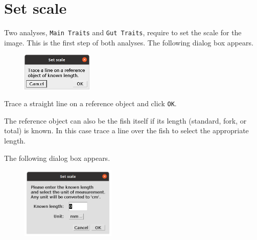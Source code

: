 \documentclass[
  letterpaper,
]{scrbook}
\begin{document}
\hypertarget{sec-set_scale}{%
\chapter{Set scale}\label{sec-set_scale}}

Two analyses, \texttt{Main\ Traits} and \texttt{Gut\ Traits}, require to
set the scale for the image. This is the first step of both analyses.
The following dialog box appears.

\begin{figure}

{\centering \includegraphics[width=0.3\textwidth,height=\textheight]{./images/screenshots/set_scale_info.png}

}

\end{figure}

Trace a straight line on a reference object and click \texttt{OK}.

\begin{tcolorbox}[standard jigsaw,bottomtitle=1mm, toptitle=1mm, colframe=quarto-callout-tip-color-frame, colbacktitle=quarto-callout-tip-color!10!white, title=\textcolor{quarto-callout-tip-color}{\faLightbulb}\hspace{0.5em}{Tip}, titlerule=0mm, opacityback=0, arc=.35mm, opacitybacktitle=0.6, rightrule=.15mm, toprule=.15mm, coltitle=black, left=2mm, colback=white, leftrule=.75mm, bottomrule=.15mm]
The reference object can also be the fish itself if its length
(standard, fork, or total) is known. In this case trace a line over the
fish to select the appropriate length.
\end{tcolorbox}

The following dialog box appears.

\begin{figure}

{\centering \includegraphics[width=0.4\textwidth,height=\textheight]{./images/screenshots/set_scale_dialog.png}

}

\end{figure}
\end{document}
